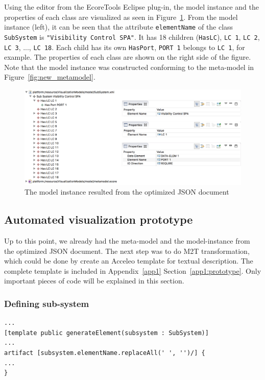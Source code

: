 Using the editor from the EcoreTools Eclipse plug-in, the model instance and the properties of each class are visualized as seen in Figure~\ref{fig:new_model_instance}. From the model instance (left), it can be seen that the attribute \texttt{elementName} of the class \texttt{SubSystem} is \texttt{"Visibility Control SPA"}. It has 18 children (\texttt{HasLC}), \texttt{LC 1}, \texttt{LC 2}, \texttt{LC 3}, ..., \texttt{LC 18}. Each child has its own \texttt{HasPort}, \texttt{PORT 1} belongs to \texttt{LC 1}, for example. The properties of each class are shown on the right side of the figure. Note that the model instance was constructed conforming to the meta-model in Figure~\ref{fig:new_metamodel}.

\begin{figure}[H]
\centering
\captionsetup{justification=centering}
\vspace{0cm}%
\includegraphics[width=0.95\linewidth]{figure/new_model/new_model_instance.png}
\caption{The model instance resulted from the optimized JSON document}
\label{fig:new_model_instance}
\end{figure}

\subsection{Automated visualization prototype}
\label{IM:automated_visualization_prototype}
Up to this point, we already had the meta-model and the model-instance from the optimized JSON document. The next step was to do M2T transformation, which could be done by create an Acceleo template for textual description. The complete template is included in Appendix~\ref{app1} Section~\ref{app1:prototype}. Only important pieces of code will be explained in this section.\\

\subsubsection*{Defining sub-system}
\begin{lstlisting}[caption=Defining \texttt{artifact} for the sub-system,label=code:defining_subsystem]
...
[template public generateElement(subsystem : SubSystem)]
...
artifact [subsystem.elementName.replaceAll(' ', '')/] {
...
}
\end{lstlisting}

